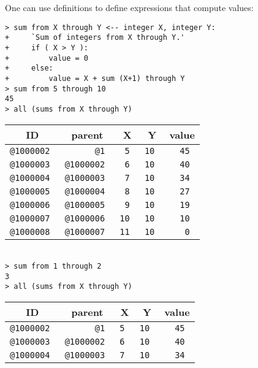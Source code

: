 \documentclass[12pt]{article}
\newenvironment{indpar}[1][0.3in]%
	{\begin{list}{}%
		     {\setlength{\itemsep}{0in}%
		      \setlength{\topsep}{0in}%
		      \setlength{\parsep}{1ex}%
		      \setlength{\labelwidth}{#1}%
		      \setlength{\leftmargin}{#1}%
		      \addtolength{\leftmargin}{\labelsep}}%
	 \item}%
	{\end{list}}
\begin{document}
One can use definitions to define expressions that compute values:

\begin{indpar}
\verb|> sum from X through Y <-- integer X, integer Y:| \\
\verb|+     `Sum of integers from X through Y.'| \\
\verb|+     if ( X > Y ):| \\
\verb|+         value = 0| \\
\verb|+     else:| \\
\verb|+         value = X + sum (X+1) through Y| \\
\verb|> sum from 5 through 10| \\
\verb|45| \\
\verb|> all (sums from X through Y)| \\
\begin{tabular}{|r|r|r|r|r|}
\hline
\multicolumn{1}{|c}{\bf ID} &
\multicolumn{1}{|c}{\bf parent} &
\multicolumn{1}{|c}{\bf X} &
\multicolumn{1}{|c}{\bf Y} &
\multicolumn{1}{|c|}{\bf value} \\
\hline
\tt @1000002 & \tt @1		& \tt 5	& \tt	10	& \tt 45 \\
\tt @1000003 & \tt @1000002	& \tt 6	& \tt	10	& \tt 40 \\
\tt @1000004 & \tt @1000003	& \tt 7	& \tt	10	& \tt 34 \\
\tt @1000005 & \tt @1000004	& \tt 8	& \tt	10	& \tt 27 \\
\tt @1000006 & \tt @1000005	& \tt 9	& \tt	10	& \tt 19 \\
\tt @1000007 & \tt @1000006	& \tt 10	& \tt	10	& \tt 10 \\
\tt @1000008 & \tt @1000007	& \tt 11	& \tt	10	& \tt 0 \\
\hline
\end{tabular} \\[0.5ex]
\verb|> sum from 1 through 2| \\
\verb|3| \\
\verb|> all (sums from X through Y)| \\
\begin{tabular}{|r|r|r|r|r|}
\hline
\multicolumn{1}{|c}{\bf ID} &
\multicolumn{1}{|c}{\bf parent} &
\multicolumn{1}{|c}{\bf X} &
\multicolumn{1}{|c}{\bf Y} &
\multicolumn{1}{|c|}{\bf value} \\
\hline
\tt @1000002 & \tt @1		& \tt 5		& \tt	10	& \tt 45 \\
\tt @1000003 & \tt @1000002	& \tt 6		& \tt	10	& \tt 40 \\
\tt @1000004 & \tt @1000003	& \tt 7		& \tt	10	& \tt 34 \\

\end{tabular}
\end{indpar}
\end{document}
